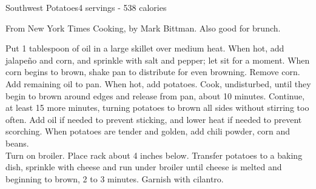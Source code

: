 \begin{recipe}{Southwest Potatoes}{4 servings - 538 calories}{}

\freeform From New York Times Cooking, by Mark Bittman. Also good for brunch.


Put 1 tablespoon of oil in a large skillet over medium heat. When hot, add jalapeño and corn, and sprinkle with salt and pepper; let sit for a moment. When corn begins to brown, shake pan to distribute for even browning. Remove corn.\\

Add remaining oil to pan. When hot, add potatoes. Cook, undisturbed, until they begin to brown around edges and release from pan, about 10 minutes. Continue, at least 15 more minutes, turning potatoes to brown all sides without stirring too often. Add oil if needed to prevent sticking, and lower heat if needed to prevent scorching. When potatoes are tender and golden, add chili powder, corn and beans.\\

Turn on broiler. Place rack about 4 inches below. Transfer potatoes to a baking dish, sprinkle with cheese and run under broiler until cheese is melted and beginning to brown, 2 to 3 minutes. Garnish with cilantro.

\end{recipe}